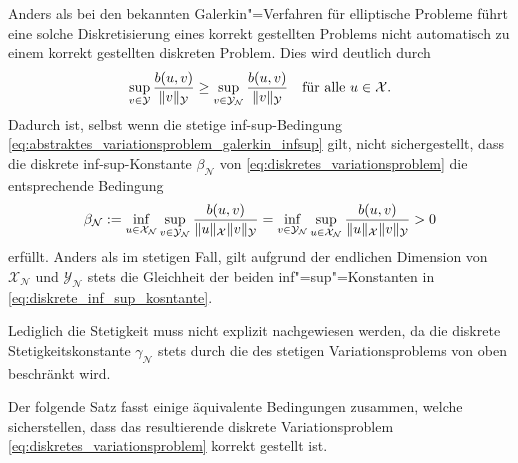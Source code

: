 \documentclass[../main.tex]{subfiles}
\begin{document}
\begin{Bemerkung}
    \label{bemerkung:zur_wohldefiniertheit}
    Anders als bei den bekannten Galerkin"=Verfahren für elliptische Probleme führt eine solche Diskretisierung eines korrekt gestellten Problems nicht automatisch zu einem korrekt gestellten diskreten Problem.
    Dies wird deutlich durch
    \begin{equation}
        \sup_{v \in \mathcal Y} \frac{b(u, v)}{\norm{v}_{\mathcal Y}} \geq \sup_{v \in \mathcal Y_{\mathcal N}} \frac{b(u, v)}{\norm{v}_{\mathcal Y}} \quad \fa u \in \mathcal X.
    \end{equation}
    Dadurch ist, selbst wenn die stetige inf-sup-Bedingung \cref{eq:abstraktes_variationsproblem_galerkin_infsup} gilt, nicht sichergestellt, dass die diskrete inf-sup-Konstante $\beta_{\mathcal N}$ von \cref{eq:diskretes_variationsproblem} die entsprechende Bedingung
    \begin{equation}
        \label{eq:diskrete_inf_sup_kosntante}
        \beta_{\mathcal N} := \inf_{u \in \mathcal X_{\mathcal N}} \sup_{v \in \mathcal Y_{\mathcal N}} \frac{b(u, v)}{\norm{u}_{\mathcal X} \norm{v}_{\mathcal Y}} = \inf_{v \in \mathcal Y_{\mathcal N}} \sup_{u \in \mathcal X_{\mathcal N}} \frac{b(u, v)}{\norm{u}_{\mathcal X} \norm{v}_{\mathcal Y}} > 0
    \end{equation}
    erfüllt.
   Anders als im stetigen Fall, gilt aufgrund der endlichen Dimension von $\mathcal X_{\mathcal N}$ und $\mathcal Y_{\mathcal N}$ stets die Gleichheit der beiden inf"=sup"=Konstanten in \cref{eq:diskrete_inf_sup_kosntante}.

   Lediglich die Stetigkeit muss nicht explizit nachgewiesen werden, da die diskrete Stetigkeitskonstante $\gamma_{\mathcal N}$ stets durch die des stetigen Variationsproblems von oben beschränkt wird.
\end{Bemerkung}

Der folgende Satz fasst einige äquivalente Bedingungen zusammen, welche sicherstellen, dass das resultierende diskrete Variationsproblem \cref{eq:diskretes_variationsproblem} korrekt gestellt ist.
\end{document}
